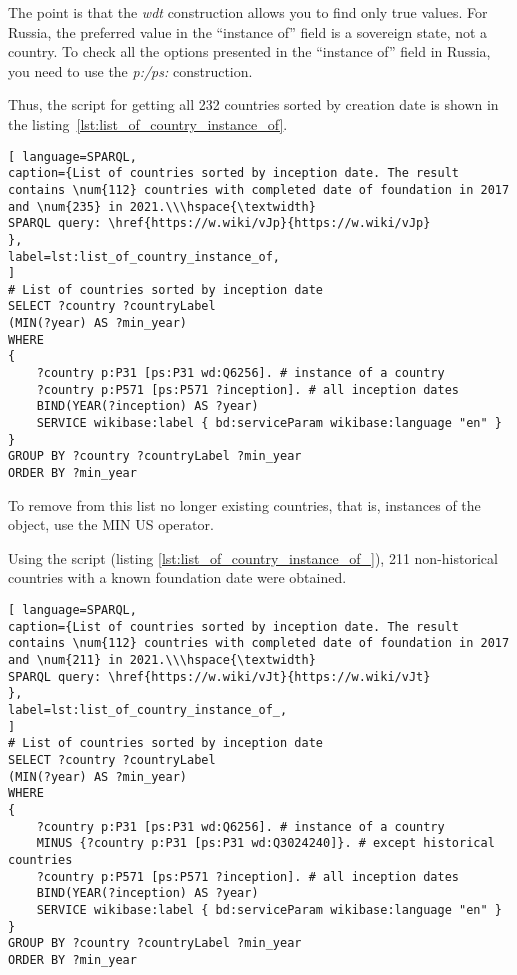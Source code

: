 The point is that the \emph{wdt} construction allows you to find only true values. 
For Russia, the preferred value in the ``instance of'' field is a sovereign state, not a country. 
To check all the options presented in the ``instance of'' field in Russia, 
you need to use the \emph{p:/ps:} construction.

Thus, the script for getting all 232 countries sorted by creation date is shown in the listing~\ref{lst:list_of_country_instance_of}.

\begin{lstlisting}[ language=SPARQL, 
caption={List of countries sorted by inception date. The result contains \num{112} countries with completed date of foundation in 2017 and \num{235} in 2021.\\\hspace{\textwidth}
SPARQL query: \href{https://w.wiki/vJp}{https://w.wiki/vJp}
},
label=lst:list_of_country_instance_of, 					
]
# List of countries sorted by inception date
SELECT ?country ?countryLabel
(MIN(?year) AS ?min_year)
WHERE
{
	?country p:P31 [ps:P31 wd:Q6256]. # instance of a country 
	?country p:P571 [ps:P571 ?inception]. # all inception dates
	BIND(YEAR(?inception) AS ?year)
	SERVICE wikibase:label { bd:serviceParam wikibase:language "en" }
}
GROUP BY ?country ?countryLabel ?min_year
ORDER BY ?min_year
\end{lstlisting}

To remove from this list no longer existing countries, that is, instances of the  object, use the MIN US operator.

Using the script (listing \ref{lst:list_of_country_instance_of_}), 211 non-historical countries with a known foundation date were obtained.
\begin{lstlisting}[ language=SPARQL, 
caption={List of countries sorted by inception date. The result contains \num{112} countries with completed date of foundation in 2017 and \num{211} in 2021.\\\hspace{\textwidth}
SPARQL query: \href{https://w.wiki/vJt}{https://w.wiki/vJt}
},
label=lst:list_of_country_instance_of_, 					
]
# List of countries sorted by inception date
SELECT ?country ?countryLabel 
(MIN(?year) AS ?min_year)
WHERE
{
	?country p:P31 [ps:P31 wd:Q6256]. # instance of a country 
	MINUS {?country p:P31 [ps:P31 wd:Q3024240]}. # except historical countries
	?country p:P571 [ps:P571 ?inception]. # all inception dates
	BIND(YEAR(?inception) AS ?year)
	SERVICE wikibase:label { bd:serviceParam wikibase:language "en" }
}
GROUP BY ?country ?countryLabel ?min_year
ORDER BY ?min_year
\end{lstlisting}


